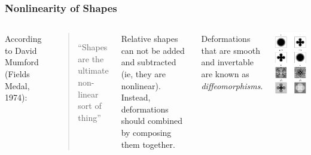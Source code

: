 \documentclass{beamer}
\begin{document}
\begin{frame}
\frametitle{Nonlinearity of Shapes}
\begin{columns}[c]
According to David Mumford (Fields Medal, 1974):
\begin{quote}
``Shapes are the ultimate non-linear sort of thing''
\end{quote}

Relative shapes can not be added and subtracted (ie, they are nonlinear).
Instead, deformations should combined by composing them together.

Deformations that are smooth and invertable are known as \emph{diffeomorphisms}.

\includegraphics[height=.85\textheight]{2Dpics}
\end{columns}
\end{frame}
\end{document}
